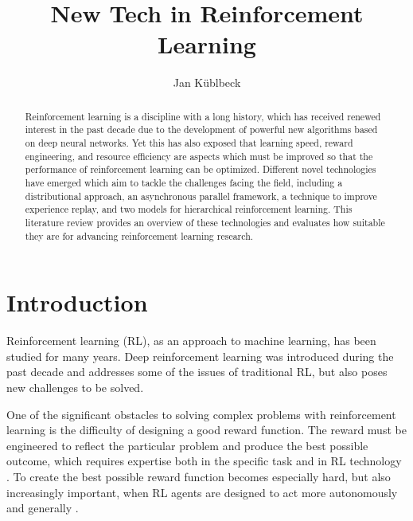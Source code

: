 \documentclass[runningheads]{llncs}
\begin{document}
%
\title{New Tech in Reinforcement Learning}
%
%
\author{Jan Küblbeck}
%
%
\maketitle              %
%
\begin{abstract}
Reinforcement learning is a discipline with a long history, which has received renewed interest in the past decade due to the development of powerful new algorithms based on deep neural networks.
Yet this has also exposed that learning speed, reward engineering, and resource efficiency are aspects which must be improved so that the performance of reinforcement learning can be optimized.
Different novel technologies have emerged which aim to tackle the challenges facing the field, including a distributional approach, an asynchronous parallel framework, a technique to improve experience replay, and two models for hierarchical reinforcement learning.
This literature review provides an overview of these technologies and evaluates how suitable they are for advancing reinforcement learning research.
\end{abstract}
%
%
%
\section{Introduction}

Reinforcement learning (RL), as an approach to machine learning, has been studied for many years. Deep reinforcement learning was introduced during the past decade and addresses some of the issues of traditional RL, but also poses new challenges to be solved.

One of the significant obstacles to solving complex problems with reinforcement learning is the difficulty of designing a good reward function. The reward must be engineered to reflect the particular problem and produce the best possible outcome, which requires expertise both in the specific task and in RL technology \cite{andrychowicz2017hindsight}. To create the best possible reward function becomes especially hard, but also increasingly important, when RL agents are designed to act more autonomously and generally \cite{dewey2014reinforcement}.
\end{document}

